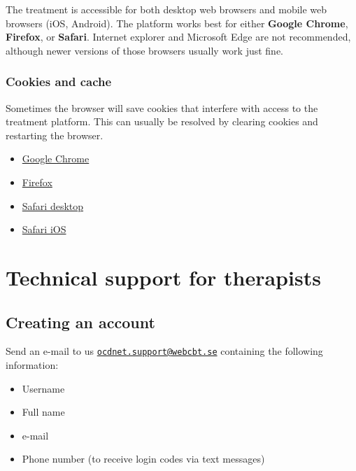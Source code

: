\documentclass[]{book}
\providecommand{\tightlist}{%
  \setlength{\itemsep}{0pt}\setlength{\parskip}{0pt}}
\begin{document}
The treatment is accessible for both desktop web browsers and mobile web browsers (iOS, Android). The platform works best for either \textbf{Google Chrome}, \textbf{Firefox}, or \textbf{Safari}. Internet explorer and Microsoft Edge are not recommended, although newer versions of those browsers usually work just fine.

\hypertarget{cookies-and-cache}{%
\subsubsection{Cookies and cache}\label{cookies-and-cache}}

Sometimes the browser will save cookies that interfere with access to the treatment platform. This can usually be resolved by clearing cookies and restarting the browser.

\begin{itemize}
\tightlist
\item
  \href{https://support.google.com/chrome/answer/95647?co=GENIE.Platform\%3DDesktop\&hl=en}{Google Chrome}
\item
  \href{https://support.mozilla.org/en-US/kb/delete-cookies-remove-info-websites-stored}{Firefox}
\item
  \href{https://support.apple.com/kb/ph21411?locale=en_US}{Safari desktop}
\item
  \href{https://support.apple.com/en-gb/HT201265}{Safari iOS}
\end{itemize}

\hypertarget{technical-support-for-therapists}{%
\section{Technical support for therapists}\label{technical-support-for-therapists}}

\hypertarget{creating-an-account}{%
\subsection{Creating an account}\label{creating-an-account}}

Send an e-mail to us \href{mailto:ocdnet.support@webcbt.se}{\nolinkurl{ocdnet.support@webcbt.se}} containing the following information:

\begin{itemize}
\tightlist
\item
  Username
\item
  Full name
\item
  e-mail
\item
  Phone number (to receive login codes via text messages)
\end{itemize}
\end{document}
